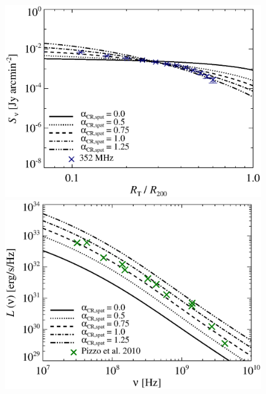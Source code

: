 \documentclass[fleqn,usenatbib,useAMS]{mnras}
\newcommand{\Mflatturb}{{\it M-turbulence}\xspace}
\begin{document}
\begin{figure}
\begin{minipage}{1\columnwidth}
\begin{center}
   \end{center}
\end{minipage}
\\
\begin{minipage}{1\columnwidth}
  \begin{center}%
    \includegraphics[width=\columnwidth]{prof.comp.KrTTDth.aCR.eps}
  \end{center}
\end{minipage}
\begin{minipage}{1\columnwidth}
   \begin{center}%
     \includegraphics[width=\columnwidth]{spec.comp.KrTTDth.aCR.eps}

\end{center}
\end{minipage}
\end{figure}
\end{document}
